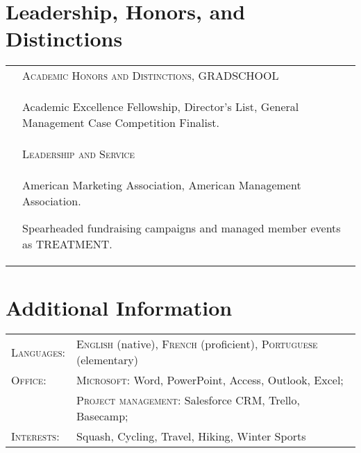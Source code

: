\documentclass[a4paper,10pt]{article}
\begin{document}
\begin{supertabular}{l p{0.55cm} p{13.9cm}}
\end{supertabular}





\smallskip
\section{Leadership, Honors, and Distinctions}
\begin{supertabular}{p{3.4cm} p{13.9cm}}

	\textsc{}		 				& \textsc{Academic Honors and Distinctions}, GRADSCHOOL \\
														& \begin{enumerate*}[label =$\diamond$, itemjoin={\newline}]
																\item \footnotesize Academic Excellence Fellowship, Director's List, General Management Case Competition Finalist.
																\end{enumerate*} \vspace{2mm} \\

	\textsc{} 						& \textsc{Leadership and Service} \\
														& \begin{enumerate*}[label =$\diamond$, itemjoin={\newline}]
																\item \footnotesize American Marketing Association, American Management Association.
																\item \footnotesize  Spearheaded fundraising campaigns and managed member events as TREATMENT.
																\end{enumerate*} \vspace{2mm} \\



\end{supertabular}



\smallskip
\section{Additional Information}
\begin{supertabular}{p{3.4cm} p{13.9cm}}
	\textsc{Languages:}			& \small\textsc{English} (native), \textsc{French} (proficient), \textsc{Portuguese} (elementary) \vspace{1mm} \\

	\textsc{Office:}			& \small\textsc{Microsoft}: \footnotesize Word, PowerPoint, Access, Outlook, Excel; \\
								& \small\textsc{Project management:} \footnotesize Salesforce CRM, Trello, Basecamp; \vspace{1mm} \\

	\textsc{Interests:} 		& \small Squash, Cycling, Travel, Hiking, Winter Sports \\

\end{supertabular}
\end{document}
